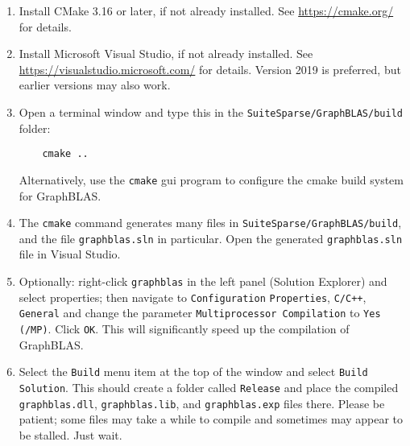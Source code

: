 \documentclass[12pt]{article}
\begin{document}
\begin{enumerate}

\item Install CMake 3.16 or later, if not already installed.
    See \url{https://cmake.org/} for details.

\item Install Microsoft Visual Studio, if not already installed.
    See \url{https://visualstudio.microsoft.com/} for details.
    Version 2019 is preferred, but earlier versions may also work.

\item Open a terminal window and type this in the
    \verb'SuiteSparse/GraphBLAS/build' folder:

    \vspace{-0.1in}
    {\small
    \begin{verbatim}
    cmake ..  \end{verbatim} }
    \vspace{-0.1in}

    Alternatively, use the \verb'cmake' gui program to configure
    the cmake build system for GraphBLAS.

\item The \verb'cmake' command generates many files in
    \verb'SuiteSparse/GraphBLAS/build', and the file \verb'graphblas.sln' in
    particular.  Open the generated \verb'graphblas.sln' file in Visual Studio.

\item Optionally: right-click \verb'graphblas' in the left panel (Solution
    Explorer) and select properties; then navigate to \verb'Configuration'
    \verb'Properties', \verb'C/C++', \verb'General' and change the parameter
    \verb'Multiprocessor Compilation' to \verb'Yes (/MP)'.  Click \verb'OK'.
    This will significantly speed up the compilation of GraphBLAS.

\item Select the \verb'Build' menu item at the top of the window and
    select \verb'Build Solution'.  This should create a folder called
    \verb'Release' and place the compiled \verb'graphblas.dll',
    \verb'graphblas.lib', and \verb'graphblas.exp' files there.  Please be
    patient; some files may take a while to compile and sometimes may appear to
    be stalled.  Just wait.



\end{enumerate}
\end{document}
